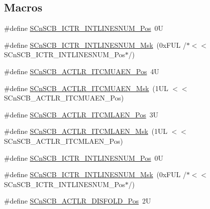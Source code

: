 \subsection*{Macros}
\begin{DoxyCompactItemize}
\item 
\#define \mbox{\hyperlink{group___c_m_s_i_s___s_cn_s_c_b_ga0777ddf379af50f9ca41d40573bfffc5}{S\+Cn\+S\+C\+B\+\_\+\+I\+C\+T\+R\+\_\+\+I\+N\+T\+L\+I\+N\+E\+S\+N\+U\+M\+\_\+\+Pos}}~0U
\item 
\#define \mbox{\hyperlink{group___c_m_s_i_s___s_cn_s_c_b_ga3efa0f5210051464e1034b19fc7b33c7}{S\+Cn\+S\+C\+B\+\_\+\+I\+C\+T\+R\+\_\+\+I\+N\+T\+L\+I\+N\+E\+S\+N\+U\+M\+\_\+\+Msk}}~(0x\+F\+U\+L /$\ast$$<$$<$ S\+Cn\+S\+C\+B\+\_\+\+I\+C\+T\+R\+\_\+\+I\+N\+T\+L\+I\+N\+E\+S\+N\+U\+M\+\_\+\+Pos$\ast$/)
\item 
\#define \mbox{\hyperlink{group___c_m_s_i_s___s_cn_s_c_b_gae4360bc2810b8486ccf74e7a853e1458}{S\+Cn\+S\+C\+B\+\_\+\+A\+C\+T\+L\+R\+\_\+\+I\+T\+C\+M\+U\+A\+E\+N\+\_\+\+Pos}}~4U
\item 
\#define \mbox{\hyperlink{group___c_m_s_i_s___s_cn_s_c_b_ga034b71340cb2e5455624b715d70cb36b}{S\+Cn\+S\+C\+B\+\_\+\+A\+C\+T\+L\+R\+\_\+\+I\+T\+C\+M\+U\+A\+E\+N\+\_\+\+Msk}}~(1\+U\+L $<$$<$ S\+Cn\+S\+C\+B\+\_\+\+A\+C\+T\+L\+R\+\_\+\+I\+T\+C\+M\+U\+A\+E\+N\+\_\+\+Pos)
\item 
\#define \mbox{\hyperlink{group___c_m_s_i_s___s_cn_s_c_b_gad5d71c0786cdb8a28f322b545d218aa7}{S\+Cn\+S\+C\+B\+\_\+\+A\+C\+T\+L\+R\+\_\+\+I\+T\+C\+M\+L\+A\+E\+N\+\_\+\+Pos}}~3U
\item 
\#define \mbox{\hyperlink{group___c_m_s_i_s___s_cn_s_c_b_ga96ed7dd2124586ddd816973d665d2014}{S\+Cn\+S\+C\+B\+\_\+\+A\+C\+T\+L\+R\+\_\+\+I\+T\+C\+M\+L\+A\+E\+N\+\_\+\+Msk}}~(1\+U\+L $<$$<$ S\+Cn\+S\+C\+B\+\_\+\+A\+C\+T\+L\+R\+\_\+\+I\+T\+C\+M\+L\+A\+E\+N\+\_\+\+Pos)
\item 
\#define \mbox{\hyperlink{group___c_m_s_i_s___s_cn_s_c_b_ga0777ddf379af50f9ca41d40573bfffc5}{S\+Cn\+S\+C\+B\+\_\+\+I\+C\+T\+R\+\_\+\+I\+N\+T\+L\+I\+N\+E\+S\+N\+U\+M\+\_\+\+Pos}}~0U
\item 
\#define \mbox{\hyperlink{group___c_m_s_i_s___s_cn_s_c_b_ga3efa0f5210051464e1034b19fc7b33c7}{S\+Cn\+S\+C\+B\+\_\+\+I\+C\+T\+R\+\_\+\+I\+N\+T\+L\+I\+N\+E\+S\+N\+U\+M\+\_\+\+Msk}}~(0x\+F\+U\+L /$\ast$$<$$<$ S\+Cn\+S\+C\+B\+\_\+\+I\+C\+T\+R\+\_\+\+I\+N\+T\+L\+I\+N\+E\+S\+N\+U\+M\+\_\+\+Pos$\ast$/)
\item 
\#define \mbox{\hyperlink{group___c_m_s_i_s___s_cn_s_c_b_gaab395870643a0bee78906bb15ca5bd02}{S\+Cn\+S\+C\+B\+\_\+\+A\+C\+T\+L\+R\+\_\+\+D\+I\+S\+F\+O\+L\+D\+\_\+\+Pos}}~2U

\end{DoxyCompactItemize}
